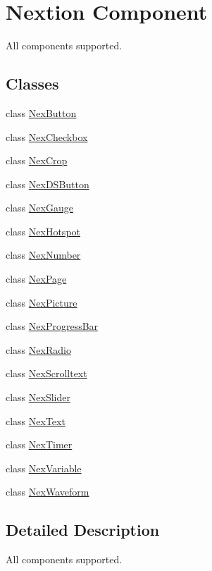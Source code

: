 \hypertarget{group___component}{\section{Nextion Component}
\label{group___component}
}


All components supported.  


\subsection*{Classes}
\begin{DoxyCompactItemize}
\item 
class \hyperlink{class_nex_button}{Nex\+Button}
\item 
class \hyperlink{class_nex_checkbox}{Nex\+Checkbox}
\item 
class \hyperlink{class_nex_crop}{Nex\+Crop}
\item 
class \hyperlink{class_nex_d_s_button}{Nex\+D\+S\+Button}
\item 
class \hyperlink{class_nex_gauge}{Nex\+Gauge}
\item 
class \hyperlink{class_nex_hotspot}{Nex\+Hotspot}
\item 
class \hyperlink{class_nex_number}{Nex\+Number}
\item 
class \hyperlink{class_nex_page}{Nex\+Page}
\item 
class \hyperlink{class_nex_picture}{Nex\+Picture}
\item 
class \hyperlink{class_nex_progress_bar}{Nex\+Progress\+Bar}
\item 
class \hyperlink{class_nex_radio}{Nex\+Radio}
\item 
class \hyperlink{class_nex_scrolltext}{Nex\+Scrolltext}
\item 
class \hyperlink{class_nex_slider}{Nex\+Slider}
\item 
class \hyperlink{class_nex_text}{Nex\+Text}
\item 
class \hyperlink{class_nex_timer}{Nex\+Timer}
\item 
class \hyperlink{class_nex_variable}{Nex\+Variable}
\item 
class \hyperlink{class_nex_waveform}{Nex\+Waveform}
\end{DoxyCompactItemize}


\subsection{Detailed Description}
All components supported. 

